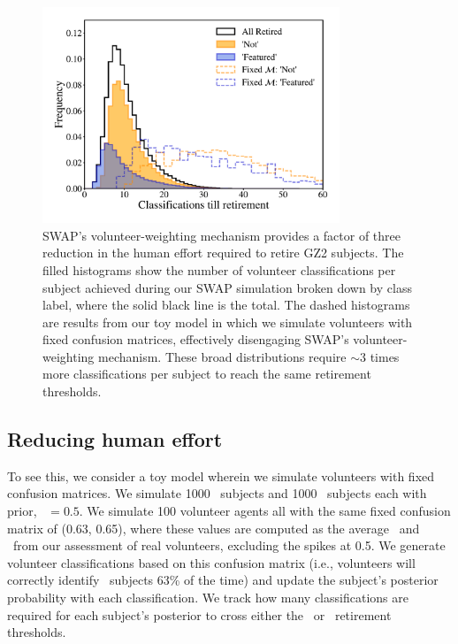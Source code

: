 \begin{figure}[t!] 
\centering
\includegraphics[width=3.5in]{Figures/human_machine/f4.pdf}
\caption[SWAP's volunteer-weighting mechanism provides a factor of three reduction in the required human effort for classification tasks.]{SWAP's volunteer-weighting mechanism provides a factor of three reduction in the human effort required to retire GZ2 subjects. The filled histograms show the number of volunteer classifications per subject achieved during our SWAP simulation broken down by class label, where the solid black line is the total. The dashed histograms are results from our toy model in which we simulate volunteers with fixed confusion matrices, effectively disengaging SWAP's volunteer-weighting mechanism. These broad distributions require $\sim$3 times more classifications per subject to reach the same retirement thresholds. } \label{fig: swap vote distributions}
\end{figure}

\subsection{Reducing human effort}
 To see this, we consider a toy model wherein we simulate volunteers with fixed confusion matrices. We simulate 1000 \feat~subjects and 1000 \notfeat~subjects each with prior, \p~$ = 0.5$. We simulate 100 volunteer agents all with the same fixed confusion matrix of (0.63, 0.65), where these values are computed as the average \Pf~and \Pn~from our assessment of real volunteers, excluding the spikes at 0.5. We generate volunteer classifications based on this confusion matrix (i.e., volunteers will correctly identify \feat~subjects 63\% of the time) and update the subject's posterior probability with each classification. We track how many classifications are required for each subject's posterior to cross either the \feat~or \notfeat~retirement thresholds. 

